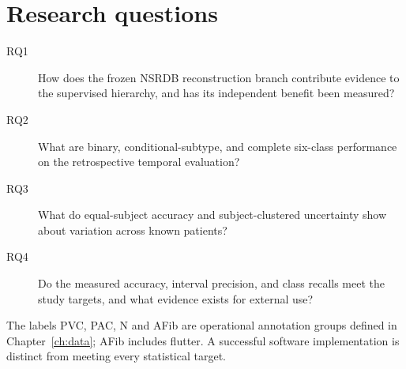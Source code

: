 \section{Research questions}
\begin{description}
\item[RQ1] How does the frozen NSRDB reconstruction branch contribute evidence
to the supervised hierarchy, and has its independent benefit been measured?
\item[RQ2] What are binary, conditional-subtype, and complete six-class
performance on the retrospective temporal evaluation?
\item[RQ3] What do equal-subject accuracy and subject-clustered uncertainty
show about variation across known patients?
\item[RQ4] Do the measured accuracy, interval precision, and class recalls
meet the study targets, and what evidence exists for external use?
\end{description}

The labels PVC, PAC, N and AFib are operational annotation groups defined in
Chapter~\ref{ch:data}; AFib includes flutter. A successful software
implementation is distinct from meeting every statistical target.
